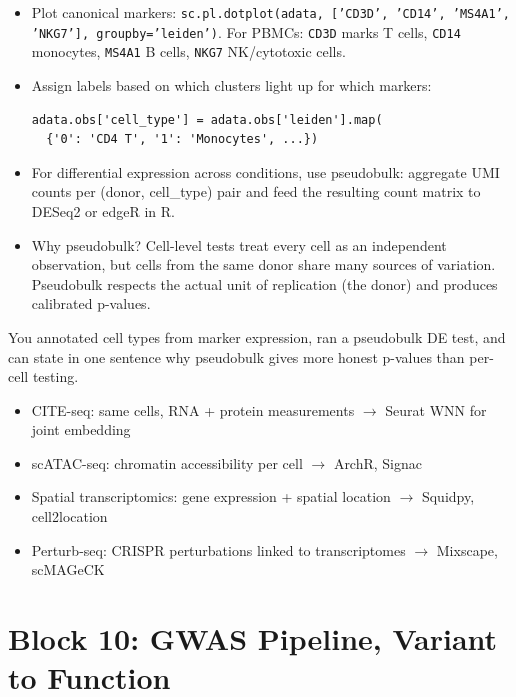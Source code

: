\begin{itemize}[nosep]
  \item Plot canonical markers: \texttt{sc.pl.dotplot(adata, ['CD3D', 'CD14', 'MS4A1', 'NKG7'], groupby='leiden')}. For PBMCs: \texttt{CD3D} marks T cells, \texttt{CD14} monocytes, \texttt{MS4A1} B cells, \texttt{NKG7} NK/cytotoxic cells.
  \item Assign labels based on which clusters light up for which markers:
    \begin{lstlisting}
adata.obs['cell_type'] = adata.obs['leiden'].map(
  {'0': 'CD4 T', '1': 'Monocytes', ...})
    \end{lstlisting}
  \item For differential expression across conditions, use pseudobulk: aggregate UMI counts per (donor, cell\_type) pair and feed the resulting count matrix to DESeq2 or edgeR in R.
  \item Why pseudobulk? Cell-level tests treat every cell as an independent observation, but cells from the same donor share many sources of variation. Pseudobulk respects the actual unit of replication (the donor) and produces calibrated p-values.
\end{itemize}
\begin{winbox}[Checkpoint]
You annotated cell types from marker expression, ran a pseudobulk DE test, and can state in one sentence why pseudobulk gives more honest p-values than per-cell testing.
\end{winbox}

\begin{tipbox}
\begin{itemize}[nosep]
  \item CITE-seq: same cells, RNA + protein measurements $\to$ Seurat WNN for joint embedding
  \item scATAC-seq: chromatin accessibility per cell $\to$ ArchR, Signac
  \item Spatial transcriptomics: gene expression + spatial location $\to$ Squidpy, cell2location
  \item Perturb-seq: CRISPR perturbations linked to transcriptomes $\to$ Mixscape, scMAGeCK
\end{itemize}
\end{tipbox}


\section{Block 10: GWAS Pipeline, Variant to Function}

